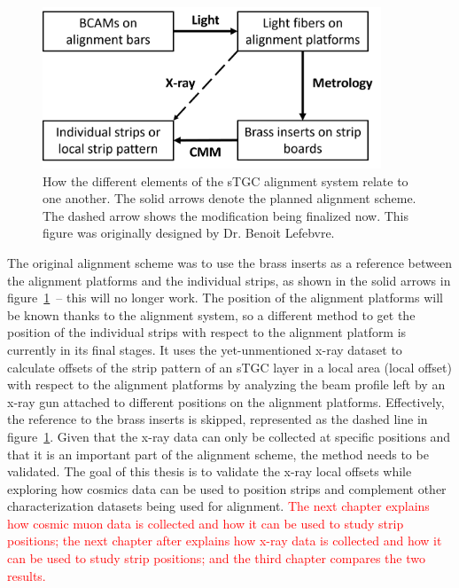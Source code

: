 \begin{figure}
    \centering
    \includegraphics[width = 0.9\textwidth]{figures/alignment_system_element_relations.png}
    \caption{How the different elements of the sTGC alignment system relate to one another. The solid arrows denote the planned alignment scheme. The dashed arrow shows the modification being finalized now. This figure was originally designed by Dr. Benoit Lefebvre.}
    \label{fig:alignment_elements}
\end{figure}

The original alignment scheme was to use the brass inserts as a reference between the alignment platforms and the individual strips, as shown in the solid arrows in figure~\ref{fig:alignment_elements}~-- this will no longer work. The position of the alignment platforms will be known thanks to the alignment system, so a different method to get the position of the individual strips with respect to the alignment platform is currently in its final stages. It uses the yet-unmentioned x-ray dataset to calculate offsets of the strip pattern of an sTGC layer in a local area (local offset) with respect to the alignment platforms by analyzing the beam profile left by an x-ray gun attached to different positions on the alignment platforms. Effectively, the reference to the brass inserts is skipped, represented as the dashed line in figure~\ref{fig:alignment_elements}. Given that the x-ray data can only be collected at specific positions and that it is an important part of the alignment scheme, the method needs to be validated. The goal of this thesis is to validate the x-ray local offsets while exploring how cosmics data can be used to position strips and complement other characterization datasets being used for alignment. \textcolor{red}{The next chapter explains how cosmic muon data is collected and how it can be used to study strip positions; the next chapter after explains how x-ray data is collected and how it can be used to study strip positions; and the third chapter compares the two results.}

